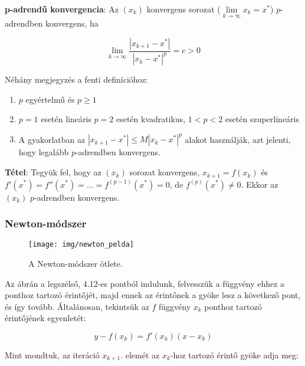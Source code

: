 \documentclass[margin=0px]{article}
\begin{document}
\noindent \textbf{p-adrendű konvergencia}: Az $(x_{k})$ konvergens sorozat ($\lim\limits_{k \to \infty} x_{k} = x^{*}$)
$p$-adrendben konvergens, ha

\begin{displaymath}
    \lim\limits_{k \to \infty} \frac{|x_{k+1} - x^{*}|}{|x_{k}-x^{*}|^{p}} = c > 0
\end{displaymath}

\noindent Néhány megjegyzés a fenti definícióhoz:

\begin{enumerate}
    \item	$p$ egyértelmű és $p \geq 1$

    \item	$p=1$ esetén lineáris $p=2$ esetén kvadratikus, $1 < p < 2$ esetén szuperlineáris

    \item	A gyakorlatban az $|x_{k+1} - x^{*}| \leq M|x_{k} - x^{*}|^{p}$ alakot használják, azt jelenti, hogy
          legalább $p$-adrendben konvergens.
\end{enumerate}

\noindent \textbf{Tétel}: Tegyük fel, hogy az $(x_{k})$ sorozat konvergens,
$x_{k+1} = f(x_{k})$ és $f'(x^{*}) = f''(x^{*}) = ... = f^{(p-1)}(x^{*}) = 0$, de $f^{(p)}(x^{*}) \not = 0$.
Ekkor az $(x_{k})$ $p$-adrendben konvergens.

\subsubsection{Newton-módszer}

\begin{figure}[H]
    \centering
    \texttt{[image: img/newton\_pelda]}
    \caption{A Newton-módszer ötlete.}
    \label{fig:newton_pelda}
\end{figure}

Az ábrán a legszélső, 4.12-es pontból indulunk, felvesszük a függvény ehhez a ponthoz tartozó
érintőjét, majd ennek az érintőnek a gyöke lesz a következő pont, és így tovább. Általánosan,
tekintsük az $f$ függvény $x_{k}$ ponthoz tartozó érintőjének egyenletét:

\begin{displaymath}
    y - f(x_{k}) = f'(x_{k}) (x-x_{k})
\end{displaymath}

\noindent Mint mondtuk, az iteráció $x_{k+1}$. elemét az $x_{k}$-hoz tartozó érintő gyöke adja meg:
\end{document}
